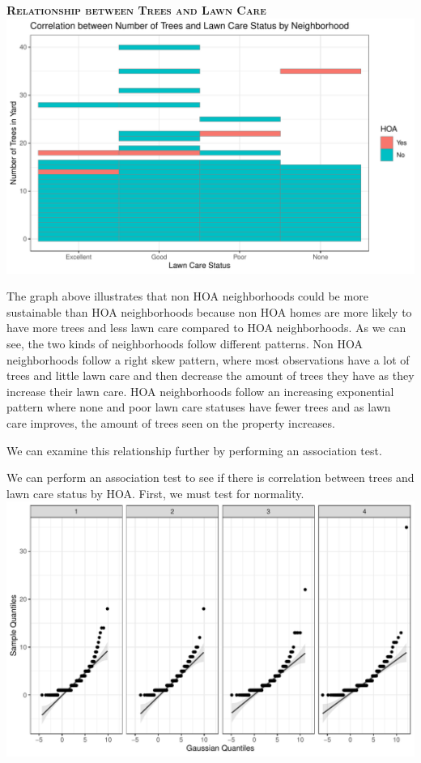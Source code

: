 \documentclass{article}
\begin{document}
\newpage
\textsc{\textbf{Relationship between Trees and Lawn Care}}
\newline
\newline
\includegraphics{exam22-034}

The graph above illustrates that non HOA neighborhoods could be more sustainable than HOA neighborhoods because non HOA homes are more likely to have more trees and less lawn care compared to HOA neighborhoods. As we can see, the two kinds of neighborhoods follow different patterns. Non HOA neighborhoods follow a right skew pattern, where most observations have a lot of trees and little lawn care and then decrease the amount of trees they have as they increase their lawn care. HOA neighborhoods follow an increasing exponential pattern where none and poor lawn care statuses have fewer trees and as lawn care improves, the amount of trees seen on the property increases.

We can examine this relationship further by performing an association test. 

We can perform an association test to see if there is correlation between trees and lawn care status by HOA. First, we must test for normality. 
\newline
\includegraphics{exam22-035}
\end{document}

